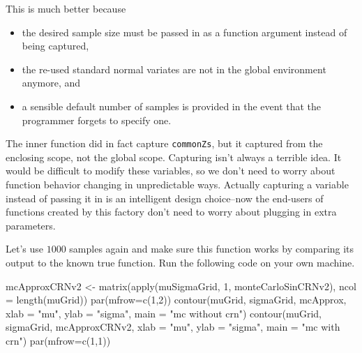 \documentclass[
  12pt,
  krantz2]{krantz}
\makeatletter
\newenvironment{Shaded}{\begin{snugshade}}{\end{snugshade}}
\newcommand{\AttributeTok}[1]{\textcolor[rgb]{0.61,0.61,0.61}{#1}}
\newcommand{\DecValTok}[1]{\textcolor[rgb]{0.06,0.06,0.06}{#1}}
\newcommand{\FunctionTok}[1]{\textcolor[rgb]{0,0,0}{#1}}
\newcommand{\NormalTok}[1]{#1}
\newcommand{\OtherTok}[1]{\textcolor[rgb]{0.37,0.37,0.37}{#1}}
\newcommand{\StringTok}[1]{\textcolor[rgb]{0.5,0.5,0.5}{#1}}
\providecommand{\tightlist}{%
  \setlength{\itemsep}{0pt}\setlength{\parskip}{0pt}}
\newenvironment{kframe}{%
\medskip{}
\setlength{\fboxsep}{.8em}
 \def\at@end@of@kframe{}%
 \ifinner\ifhmode%
  \def\at@end@of@kframe{\end{minipage}}%
  \begin{minipage}{\columnwidth}%
 \fi\fi%
 \def\FrameCommand##1{\hskip\@totalleftmargin \hskip-\fboxsep
 \colorbox{shadecolor}{##1}\hskip-\fboxsep
     \hskip-\linewidth \hskip-\@totalleftmargin \hskip\columnwidth}%
 \MakeFramed {\advance\hsize-\width
   \@totalleftmargin\z@ \linewidth\hsize
   \@setminipage}}%
 {\par\unskip\endMakeFramed%
 \at@end@of@kframe}
\renewenvironment{Shaded}{\begin{kframe}}{\end{kframe}}
\makeatother
\begin{document}
This is much better because

\begin{itemize}
\tightlist
\item
  the desired sample size must be passed in as a function argument instead of being captured,
\item
  the re-used standard normal variates are not in the global environment anymore, and
\item
  a sensible default number of samples is provided in the event that the programmer forgets to specify one.
\end{itemize}

The inner function did in fact capture \texttt{commonZs}, but it captured from the enclosing scope, not the global scope. Capturing isn't always a terrible idea. It would be difficult to modify these variables, so we don't need to worry about function behavior changing in unpredictable ways. Actually capturing a variable instead of passing it in is an intelligent design choice--now the end-users of functions created by this factory don't need to worry about plugging in extra parameters.

Let's use \(1000\) samples again and make sure this function works by comparing its output to the known true function. Run the following code on your own machine.

\begin{Shaded}
\begin{Highlighting}[]
\NormalTok{mcApproxCRNv2 }\OtherTok{\textless{}{-}} \FunctionTok{matrix}\NormalTok{(}\FunctionTok{apply}\NormalTok{(muSigmaGrid, }\DecValTok{1}\NormalTok{, monteCarloSinCRNv2), }
                        \AttributeTok{ncol =} \FunctionTok{length}\NormalTok{(muGrid))}
\FunctionTok{par}\NormalTok{(}\AttributeTok{mfrow=}\FunctionTok{c}\NormalTok{(}\DecValTok{1}\NormalTok{,}\DecValTok{2}\NormalTok{))}
\FunctionTok{contour}\NormalTok{(muGrid, sigmaGrid, mcApprox, }
        \AttributeTok{xlab =} \StringTok{"mu"}\NormalTok{, }\AttributeTok{ylab =} \StringTok{"sigma"}\NormalTok{, }\AttributeTok{main =} \StringTok{"mc without crn"}\NormalTok{)}
\FunctionTok{contour}\NormalTok{(muGrid, sigmaGrid, mcApproxCRNv2, }
        \AttributeTok{xlab =} \StringTok{"mu"}\NormalTok{, }\AttributeTok{ylab =} \StringTok{"sigma"}\NormalTok{, }\AttributeTok{main =} \StringTok{"mc with crn"}\NormalTok{)}
\FunctionTok{par}\NormalTok{(}\AttributeTok{mfrow=}\FunctionTok{c}\NormalTok{(}\DecValTok{1}\NormalTok{,}\DecValTok{1}\NormalTok{))}
\end{Highlighting}
\end{Shaded}
\end{document}
